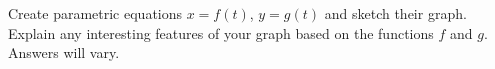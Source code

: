{Create parametric equations $x=f(t)$, $y=g(t)$ and sketch their graph. Explain any interesting features of your graph based on the functions $f$ and $g$.
}
{Answers will vary.
}
